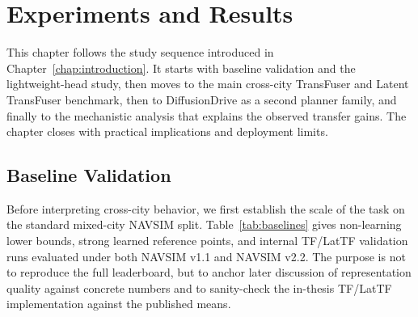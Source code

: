 \chapter{Experiments and Results}
\label{chap:experiments}

This chapter follows the study sequence introduced in Chapter~\ref{chap:introduction}. It starts with baseline validation and the lightweight-head study, then moves to the main cross-city TransFuser and Latent TransFuser benchmark, then to DiffusionDrive as a second planner family, and finally to the mechanistic analysis that explains the observed transfer gains. The chapter closes with practical implications and deployment limits.

\section{Baseline Validation}
\label{sec:exp-baselines}

Before interpreting cross-city behavior, we first establish the scale of the task on the standard mixed-city NAVSIM split. Table~\ref{tab:baselines} gives non-learning lower bounds, strong learned reference points, and internal TF/LatTF validation runs evaluated under both NAVSIM v1.1 and NAVSIM v2.2. The purpose is not to reproduce the full leaderboard, but to anchor later discussion of representation quality against concrete numbers and to sanity-check the in-thesis TF/LatTF implementation against the published means.

